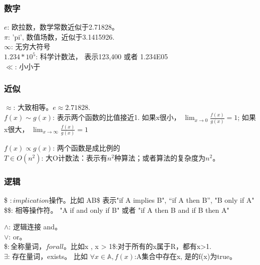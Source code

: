 \documentclass[11pt]{article}
\begin{document}
    \subsubsection{数字}\label{ux6570ux5b57}

    \(e\): 欧拉数，数学常数近似于2.71828。\\
\(\pi\): 'pi', 数值场数，近似于3.1415926.\\
\(\infty\): 无穷大符号\\
\(1.234*10^5\): 科学计数法， 表示123,400 或者 1.234E05\\
\(\ll\): 小小于

    \subsubsection{近似}\label{ux8fd1ux4f3c}

    \(\approx\): 大致相等。\(e\approx 2.71828\).\\
\(f(x)\sim g(x)\): 表示两个函数的比值接近1. 如果x很小，
\(\lim_{x\to 0}\frac{f(x)}{g(x)}=1\); 如果x很大，
\(\lim_{x\to \infty}\frac{f(x)}{g(x)}=1\)

\(f(x) \propto g(x)\): 两个函数是成比例的\\
\(T\in O(n^2)\):
大O计数法：表示有\(n^2\)种算法；或者算法的复杂度为\(n^2\)。

    \subsubsection{逻辑}\label{ux903bux8f91}

    \$ \Rightarrow \(: implication 操作。比如\) A\Rightarrow B\$ 表示"if A
implies B", ``if A then B'', "B only if A"\\
\$\Leftrightarrow \$: 相等操作符。 "A if and only if B" 或者 "if A then
B and if B then A"

\(\wedge\): 逻辑连接 and。\\
\(\vee\): or。\\
\$\forall \(: 全称量词，for all。 比如\)\forall x \in {}, x
\textgreater{} 1\$:对于所有的x属于R，都有x\textgreater{}1.\\
\(\exists\): 存在量词，exists。 比如
\(\forall x \in \mathbb{A}, f(x)\):A集合中存在x, 是的f(x)为true。


    
    
    
    
\end{document}
